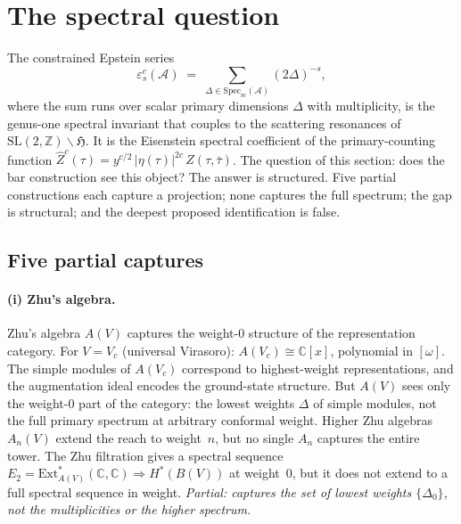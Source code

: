 \documentclass[11pt]{article}
\newcommand{\cA}{\mathcal{A}}
\newcommand{\C}{\mathbb{C}}
\newcommand{\bZ}{\mathbb{Z}}
\begin{document}
\section{The spectral question}
\label{sec:spectral-question}

The constrained Epstein series
\begin{equation}\label{eq:constrained-epstein-def}
\varepsilon^c_s(\cA)
\;=\;
\sum_{\Delta \in \mathrm{Spec}_{\mathrm{sc}}(\cA)} (2\Delta)^{-s},
\end{equation}
where the sum runs over scalar primary dimensions
$\Delta$ with multiplicity, is the genus-one spectral invariant
that couples to the scattering resonances of $\mathrm{SL}(2,\bZ)
\backslash\mathfrak{H}$.  It is the Eisenstein spectral coefficient
of the primary-counting function $\hat Z^c(\tau)
= y^{c/2}\,|\eta(\tau)|^{2c}\,Z(\tau,\bar\tau)$.
The question of this section: does the bar construction see this
object?  The answer is structured.  Five partial constructions
each capture a projection; none captures the full spectrum; the
gap is structural; and the deepest proposed identification is
false.

\subsection{Five partial captures}

\paragraph{(i) Zhu's algebra.}
Zhu's algebra $A(V)$ captures the weight-$0$ structure of the
representation category.  For $V = V_c$ (universal Virasoro):
$A(V_c) \cong \C[x]$, polynomial in $[\omega]$.  The simple
modules of $A(V_c)$ correspond to highest-weight representations,
and the augmentation ideal encodes the ground-state structure.
But $A(V)$ sees only the weight-$0$ part of the category: the
lowest weights $\Delta$ of simple modules, not the full
primary spectrum at arbitrary conformal weight.  Higher Zhu
algebras $A_n(V)$ extend the reach to weight~$n$, but no single
$A_n$ captures the entire tower.  The Zhu filtration gives a
spectral sequence $E_2 = \mathrm{Ext}^*_{A(V)}(\C,\C)
\Rightarrow H^*(B(V))$ at weight~$0$, but it does not extend
to a full spectral sequence in weight.  \emph{Partial:
captures the set of lowest weights $\{\Delta_0\}$, not the
multiplicities or the higher spectrum.}
\end{document}

